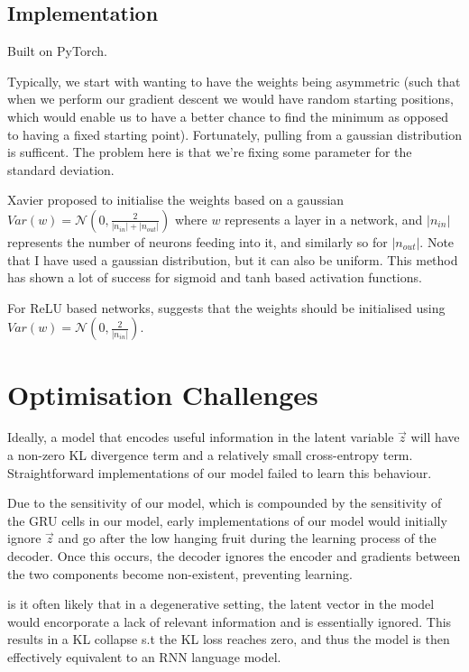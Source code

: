 \documentclass[12pt,twoside]{report}
\begin{document}
\subsection{Implementation}

Built on PyTorch.

Typically, we start with wanting to have the weights being asymmetric (such that when we perform our gradient descent we would have random starting positions, which would enable us to have a better chance to find the minimum as opposed to having a fixed starting point). Fortunately, pulling from a gaussian distribution is sufficent. The problem here is that we're fixing some parameter for the standard deviation. 


Xavier 
proposed to initialise the weights based on a gaussian $Var(w)=\mathcal{N}(0,\frac{2}{|n_{in}| + |n_{out}| })$ where $w$ represents a layer in a network, and $|n_{in}|$ represents the number of neurons feeding into it, and similarly so for $|n_{out}|$. Note that I have used a gaussian distribution, but it can also be uniform. This method has shown a lot of success for sigmoid and tanh based activation functions.

For ReLU based networks, 
suggests that the weights should be initialised using $Var(w)=\mathcal{N}(0,\frac{2}{|n_{in}|})$. 

\section{Optimisation Challenges}
\label{optimisation_challenges}

Ideally, a model that encodes useful information in the latent variable $\overrightarrow{z}$ will have a non-zero KL divergence term and a relatively small cross-entropy term. Straightforward implementations of our model failed to learn this behaviour.

Due to the sensitivity of our model, which is compounded by the sensitivity of the GRU cells in our model, early implementations of our model would initially ignore $\overrightarrow{z}$ and go after the low hanging fruit during the learning process of the decoder. Once this occurs, the decoder ignores the encoder and gradients between the two components become non-existent, preventing learning.

is it often likely that in a degenerative setting, the latent vector in the model would encorporate a lack of relevant information and is essentially ignored. This results in a KL collapse s.t the KL loss reaches zero, and thus the model is then effectively equivalent to an RNN language model.
\end{document}

